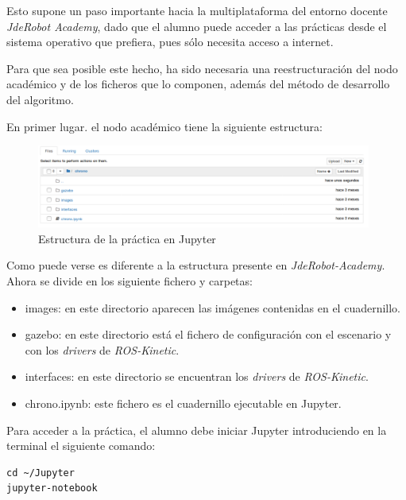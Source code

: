 Esto supone un paso importante hacia la multiplataforma del entorno docente \textit{JdeRobot Academy}, dado que el alumno puede acceder a las prácticas desde el sistema operativo que prefiera, pues sólo necesita acceso a internet.

Para que sea posible este hecho, ha sido necesaria una reestructuración del nodo académico y de los ficheros que lo componen, además del método de desarrollo del algoritmo.

En primer lugar. el nodo académico tiene la siguiente estructura:

\begin{figure}[H]
  \begin{center}
    \includegraphics[width=0.98\textwidth]{figures/estructura_jupyter.png}
		\caption{Estructura de la práctica en Jupyter}
		\label{fig.ejch}
		\end{center}
\end{figure}

Como puede verse es diferente a la estructura presente en \textit{JdeRobot-Academy}. Ahora se divide en los siguiente fichero y carpetas:

\begin{itemize}
    \item images: en este directorio aparecen las imágenes contenidas en el cuadernillo.
    \item gazebo: en este directorio está el fichero de configuración con el escenario y con los \textit{drivers} de \textit{ROS-Kinetic}.
    \item interfaces: en este directorio se encuentran los \textit{drivers} de \textit{ROS-Kinetic}.
    \item chrono.ipynb: este fichero es el cuadernillo ejecutable en Jupyter.
\end{itemize}

Para acceder a la práctica, el alumno debe iniciar Jupyter introduciendo en la terminal el siguiente comando:

\lstset{language=bash, breaklines=true, basicstyle=\footnotesize}
\begin{lstlisting}[frame=single]
cd ~/Jupyter
jupyter-notebook
\end{lstlisting}

